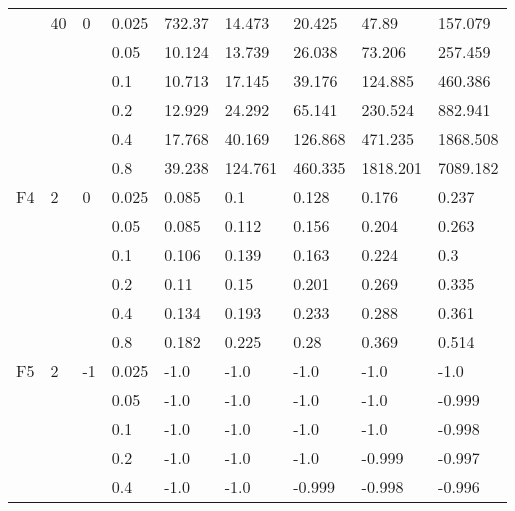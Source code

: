 \begin{longtable}{|l|l|l|l|l|l|l|l|l|}
\cmidrule{2-9} & 40  & 0        & 0.025          & 732.37     & 14.473     & 20.425     & 47.89      & 157.079    \\
\cmidrule{4-9} &     &          & 0.05           & 10.124     & 13.739     & 26.038     & 73.206     & 257.459    \\
\cmidrule{4-9} &     &          & 0.1            & 10.713     & 17.145     & 39.176     & 124.885    & 460.386    \\
\cmidrule{4-9} &     &          & 0.2            & 12.929     & 24.292     & 65.141     & 230.524    & 882.941    \\
\cmidrule{4-9} &     &          & 0.4            & 17.768     & 40.169     & 126.868    & 471.235    & 1868.508   \\
\cmidrule{4-9} &     &          & 0.8            & 39.238     & 124.761    & 460.335    & 1818.201   & 7089.182   \\ \midrule
F4             & 2   & 0        & 0.025          & 0.085      & 0.1        & 0.128      & 0.176      & 0.237      \\
\cmidrule{4-9} &     &          & 0.05           & 0.085      & 0.112      & 0.156      & 0.204      & 0.263      \\
\cmidrule{4-9} &     &          & 0.1            & 0.106      & 0.139      & 0.163      & 0.224      & 0.3        \\
\cmidrule{4-9} &     &          & 0.2            & 0.11       & 0.15       & 0.201      & 0.269      & 0.335      \\
\cmidrule{4-9} &     &          & 0.4            & 0.134      & 0.193      & 0.233      & 0.288      & 0.361      \\
\cmidrule{4-9} &     &          & 0.8            & 0.182      & 0.225      & 0.28       & 0.369      & 0.514      \\ \midrule
F5             & 2   & -1        & 0.025          & -1.0       & -1.0       & -1.0       & -1.0       & -1.0       \\
\cmidrule{4-9} &     &          & 0.05           & -1.0       & -1.0       & -1.0       & -1.0       & -0.999     \\
\cmidrule{4-9} &     &          & 0.1            & -1.0       & -1.0       & -1.0       & -1.0       & -0.998     \\
\cmidrule{4-9} &     &          & 0.2            & -1.0       & -1.0       & -1.0       & -0.999     & -0.997     \\
\cmidrule{4-9} &     &          & 0.4            & -1.0       & -1.0       & -0.999     & -0.998     & -0.996     \\

\end{longtable}
